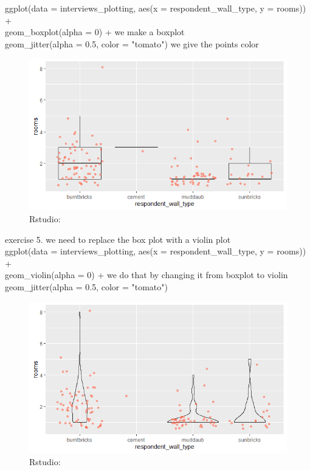 \documentclass{article}
\begin{document}
  ggplot(data = interviews\_plotting, aes(x = respondent\_wall\_type, y = rooms)) + \\
  geom\_boxplot(alpha = 0) +   we make a boxplot\\
  geom\_jitter(alpha = 0.5, color = "tomato")   we give the points color\\

\begin{figure}[H]
    \centering
    \includegraphics[width=\textwidth]{boxplot.png}
    \caption{Rstudio:}
    \label{fig:bil10}  
\end{figure}

  exercise 5. we need to replace the box plot with a violin plot\\
  ggplot(data = interviews\_plotting, aes(x = respondent\_wall\_type, y = rooms)) +\\
    geom\_violin(alpha = 0) +   we do that by changing it from boxplot to violin\\
    geom\_jitter(alpha = 0.5, color = "tomato")\\

\begin{figure}[H]
    \centering
    \includegraphics[width=\textwidth]{violin.png}
    \caption{Rstudio:}
    \label{fig:bil11}  
\end{figure}
  
\end{document}
